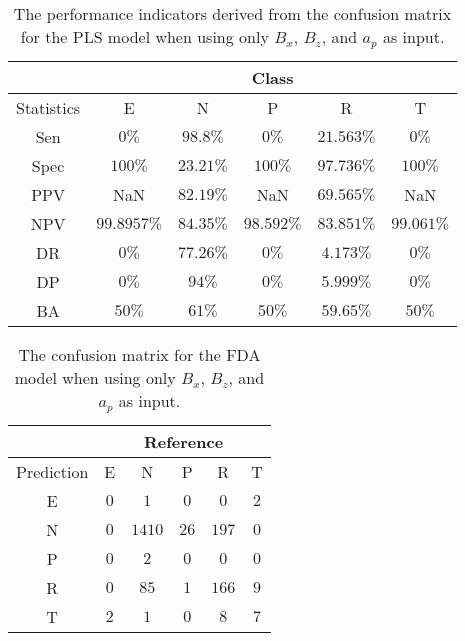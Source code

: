 \begin{table}[!ht]
	\centering
	\begin{tabular}{|c|c|c|c|c|c|}
		\hline
		 & \multicolumn{5}{c|}{Class} \\ \hline
		Statistics & E & N & P & R & T \\ \hline
		Sen & $0\%$ & $98.8\%$ & $0\%$ & $21.563\%$ & $0\%$ \\ \hline
		Spec & $100\%$ & $23.21\%$ & $100\%$ & $97.736\%$ & $100\%$ \\ \hline
		PPV & NaN & $82.19\%$ & NaN & $69.565\%$ & NaN \\ \hline
		NPV & $99.8957\%$ & $84.35\%$ & $98.592\%$ & $83.851\%$ & $99.061\%$ \\ \hline
		DR & $0\%$ & $77.26\%$ & $0\%$ & $4.173\%$ & $0\%$ \\ \hline
		DP & $0\%$ & $94\%$ & $0\%$ & $5.999\%$ & $0\%$ \\ \hline
		BA & $50\%$ & $61\%$ & $50\%$ & $59.65\%$ & $50\%$ \\ \hline
	\end{tabular}
	\caption{The performance indicators derived from the confusion matrix for the PLS model when using only $B_{x}$, $B_{z}$, and $a_{p}$ as input.}
	\label{tab:cs:reverse:xzap:pls}
\end{table}

\begin{table}[!ht]
	\centering
	\begin{tabular}{|c|c|c|c|c|c|}
		\hline
		 & \multicolumn{5}{|c|}{Reference} \\ \hline
		 Prediction & E & N & P & R & T \\ \hline
		 E & $0$ & $1$ & $0$ & $0$ & $2$ \\ \hline
		 N & $0$ & $1410$ & $26$ & $197$ & $0$ \\ \hline
		 P & $0$ & $2$ & $0$ & $0$ & $0$ \\ \hline
		 R & $0$ & $85$ & $1$ & $166$ & $9$ \\ \hline
		 T & $2$ & $1$ & $0$ & $8$ & $7$ \\ \hline
	\end{tabular}
	\caption{The confusion matrix for the FDA model when using only $B_{x}$, $B_{z}$, and $a_{p}$ as input.}
	\label{tab:cm:xzap:fda}
\end{table}

